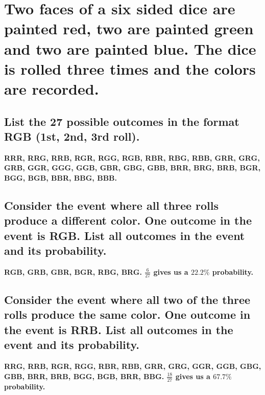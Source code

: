 \documentclass{article}
\begin{document}

\section{Two faces of a six sided dice are painted red, two are painted green
    and two are painted blue. The dice is rolled three times and the colors are recorded.}
\subsection{List the 27 possible outcomes in the format RGB (1st, 2nd, 3rd roll).}
\hspace{1cm}\textbf{RRR, RRG, RRB, RGR, RGG, RGB, RBR, RBG, RBB, GRR, GRG, GRB, GGR, GGG,
    GGB, GBR, GBG, GBB, BRR, BRG, BRB, BGR, BGG, BGB, BBR, BBG, BBB.}
\subsection{Consider the event where all three rolls produce a different color.
    One outcome in the event is RGB. List all outcomes in the event and its probability.}
\hspace{1cm}\textbf{RGB, GRB, GBR, BGR, RBG, BRG. $\frac{6}{27}$ gives us a $22.2\%$ probability.}
\subsection{Consider the event where all two of the three rolls produce the same color.
    One outcome in the event is RRB. List all outcomes in the event and its probability.}
\hspace{1cm}\textbf{RRG, RRB, RGR, RGG, RBR, RBB, GRR, GRG, GGR, GGB, GBG, GBB, BRR, BRB,
    BGG, BGB, BRR, BBG. $\frac{18}{27}$ gives us a $67.7\%$ probability.}
\clearpage
    
\end{document}
